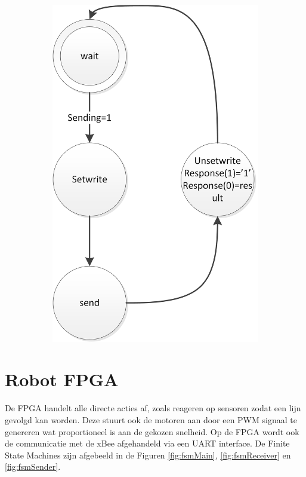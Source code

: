 \documentclass{report}
\begin{document}
\begin{figure}
\begin{subfigure}{0.23\linewidth}
\includegraphics[width=\linewidth]{FSMSender}
\end{subfigure}
\end{figure}
\section{Robot FPGA}
De FPGA handelt alle directe acties af, zoals reageren op sensoren zodat een lijn gevolgd kan worden. Deze stuurt ook de motoren aan door een PWM signaal te genereren wat proportioneel is aan de gekozen snelheid. Op de FPGA wordt ook de communicatie met de xBee afgehandeld via een UART interface. De Finite State Machines zijn afgebeeld in de Figuren \ref{fig:fsmMain}, \ref{fig:fsmReceiver} en \ref{fig:fsmSender}.
\end{document}
